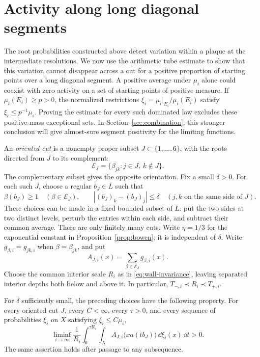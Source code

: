 \section{Activity along long diagonal segments}\label{sec:segment-entropy}

The root probabilities constructed above detect variation within a plaque at
the intermediate resolutions.  We now use the arithmetic tube estimate to
show that this variation cannot disappear across a cut for a positive
proportion of starting points over a long diagonal segment.  A positive
average under $\mu_i$ alone could coexist with zero activity on a set of
starting points of positive measure.  If $\mu_i(E_i)\geq p>0$, the
normalized restrictions $\xi_i=\mu_i|_{E_i}/\mu_i(E_i)$ satisfy
$\xi_i\leq p^{-1}\mu_i$.  Proving the estimate for every such dominated
law excludes these positive-mass exceptional sets.  In
Section~\ref{sec:combination}, this stronger conclusion will give
almost-sure segment positivity for the limiting functions.

An \emph{oriented cut} is a nonempty proper subset
$J\subset\{1,\ldots,6\}$, with the roots directed from $J$ to its complement:
\[
 \mathcal E_J=\{\beta_{jk}:j\in J,\ k\notin J\}.
\]
The complementary subset gives the opposite orientation.  Fix a small
$\delta>0$.  For each such $J$, choose a regular $b_J\in L$ such that
\begin{equation}\label{eq:cut-direction}
 \beta(b_J)\geq1\quad(\beta\in\mathcal E_J),\qquad
 |(b_J)_k-(b_J)_j|\leq\delta
 \quad(j,k\text{ on the same side of }J).
\end{equation}
These choices can be made in a fixed bounded subset of $L$: put the two
sides at two distinct levels, perturb the entries within each side, and
subtract their common average.  There are only finitely many cuts.
Write $\eta=1/3$ for the exponential constant in
Proposition~\ref{prop:bowen}; it is independent of $\delta$.
Write $g_{\beta,i}=g_{jk,i}$ when $\beta=\beta_{jk}$, and put
\[
 A_{J,i}(x)=\sum_{\beta\in\mathcal E_J}g_{\beta,i}(x).
\]
Choose the common interior scale $R_i$ as in
\eqref{eq:wall-invariance}, leaving separated interior depths both below and
above it.  In particular, $T_{-,i}\prec R_i\prec T_{+,i}$.

\begin{proposition}\label{prop:segment-activity}
For $\delta$ sufficiently small, the preceding choices have the following
property.  For every oriented cut $J$, every $C<\infty$, every $\tau>0$,
and every sequence of probabilities $\xi_i$ on $X$ satisfying
$\xi_i\leq C\mu_i$,
\begin{equation}\label{eq:segment-activity}
 \liminf_{i\to\infty}\frac1{R_i}
 \int_0^{\tau R_i}\int_X
 A_{J,i}\bigl(xa(tb_J)\bigr)\,\dd\xi_i(x)\,\dd t>0.
\end{equation}
The same assertion holds after passage to any subsequence.
\end{proposition}


